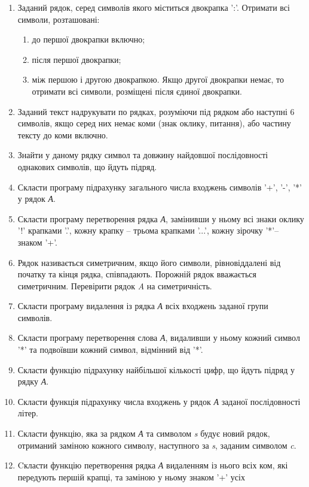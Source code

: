 \documentclass[]{article}
\makeatletter
\newcommand{\xslalph}[1]{\expandafter\@xslalph\csname c@#1\endcsname}
\newcommand{\@xslalph}[1]{%
    \ifcase#1\or а\or б\or в\or г\or д\or e\or є\or ж\or з\or i%
    \or й\or к\or л\or м\or н\or о\or п\or р\or с\or т%
    \or у\or ф\or х\or ц\or ч\or ш\or ю\or я\or аа\or бб\or вв %
    \else\@ctrerr\fi%
}
\makeatother
\begin{document}
\begin{enumerate}
\item Заданий рядок, серед символів якого міститься двокрапка ':'.
 Отримати всі символи, розташовані:
\begin{enumerate}[label=\xslalph*)]
\item до першої двокрапки включно;
\item після першої двокрапки;
\item між першою і другою двокрапкою. Якщо другої двокрапки немає, 
то отримати всі символи, розміщені після єдиної двокрапки.
\end{enumerate}

\item
  Заданий текст надрукувати по рядках, розуміючи під рядком або наступні
  6 символів, якщо серед них немає коми (знак оклику, питання), або
  частину тексту до коми включно.
\item
  Знайти у даному рядку символ та довжину найдовшої послідовності
  однакових символів, що йдуть підряд.
\item
  Скласти програму підрахунку загального числа входжень символів '+',
  '-', '*' у рядок \emph{А}.
\item
  Скласти програму перетворення рядка \emph{А}, замінивши у ньому всі
  знаки оклику '!' крапками '.', кожну крапку -- трьома крапками '...',
  кожну зірочку '*'-- знаком '+'.
\item
  Рядок називається симетричним, якщо його символи, рівновіддалені від
  початку та кінця рядка, співпадають. Порожній рядок вважається
  симетричним. Перевірити рядок \emph{A} на симетричність.
\item
  Скласти програму видалення із рядка \emph{А} всіх входжень заданої
  групи символів.
\item
  Скласти програму перетворення слова \emph{А}, видаливши у ньому кожний
  символ '*' та подвоївши кожний символ, відмінний від '*'.
\item
  Скласти функцію підрахунку найбільшої кількості цифр, що йдуть підряд
  у рядку \emph{А}.
\item
  Скласти функція підрахунку числа входжень у рядок \emph{А} заданої
  послідовності літер.
\item
  Скласти функцію, яка за рядком \emph{А} та символом \emph{s} будує
  новий рядок, отриманий заміною кожного символу, наступного за
  \emph{s}, заданим символом \emph{c}.
\item
  Cкласти функцію перетворення рядка \emph{А} видаленням із нього всіх
  ком, які передують першій крапці, та заміною у ньому знаком '+' усіх

\end{enumerate}
\end{document}
